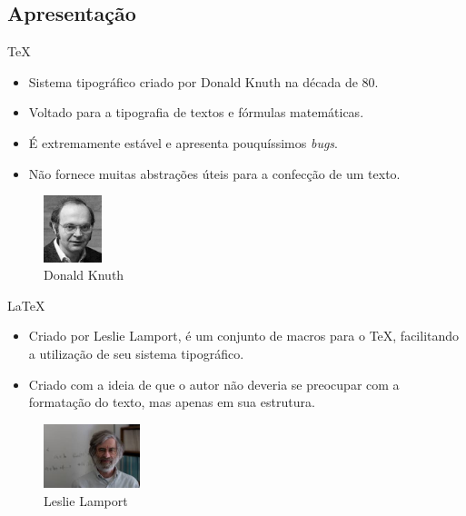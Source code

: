 \subsection {Apresentação}
\begin{frame}{\TeX{}}
    \begin{itemize}
        \item Sistema tipográfico criado por Donald Knuth na década de 80.
        \item Voltado para a tipografia de textos e fórmulas matemáticas.
        \item É extremamente estável e apresenta pouquíssimos \textit{bugs}.
        \item Não fornece muitas abstrações úteis para a confecção de um texto.
    \end{itemize}
\begin{figure}[htbp]
    \centering
    \includegraphics[width=0.15\textwidth]{figuras/donald.jpeg}
    \caption{Donald Knuth}
    \label{fig:tipografia}
\end{figure}
\end{frame}

\begin{frame}{\LaTeX{}}
    \begin{itemize}
        \item Criado por Leslie Lamport, é um conjunto de macros para o \TeX{}, facilitando a utilização de seu sistema tipográfico.
        \item Criado com a ideia de que o autor não deveria se preocupar com a formatação do texto, mas apenas em sua estrutura.
    \end{itemize}
    \begin{figure}[htbp]
    \centering
    \includegraphics[width=0.25\textwidth]{figuras/leslie.jpeg}
    \caption{Leslie Lamport}
    \label{fig:leslie}
\end{figure}
\end{frame}

